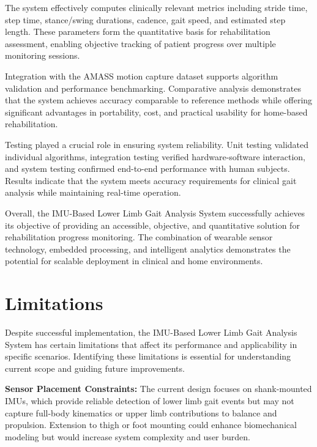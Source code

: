 \documentclass[12pt,a4paper]{report}
\begin{document}
The system effectively computes clinically relevant metrics including stride time, step time, stance/swing durations, cadence, gait speed, and estimated step length. These parameters form the quantitative basis for rehabilitation assessment, enabling objective tracking of patient progress over multiple monitoring sessions.

Integration with the AMASS motion capture dataset supports algorithm validation and performance benchmarking. Comparative analysis demonstrates that the system achieves accuracy comparable to reference methods while offering significant advantages in portability, cost, and practical usability for home-based rehabilitation.

Testing played a crucial role in ensuring system reliability. Unit testing validated individual algorithms, integration testing verified hardware-software interaction, and system testing confirmed end-to-end performance with human subjects. Results indicate that the system meets accuracy requirements for clinical gait analysis while maintaining real-time operation.

Overall, the IMU-Based Lower Limb Gait Analysis System successfully achieves its objective of providing an accessible, objective, and quantitative solution for rehabilitation progress monitoring. The combination of wearable sensor technology, embedded processing, and intelligent analytics demonstrates the potential for scalable deployment in clinical and home environments.

\section{Limitations}

Despite successful implementation, the IMU-Based Lower Limb Gait Analysis System has certain limitations that affect its performance and applicability in specific scenarios. Identifying these limitations is essential for understanding current scope and guiding future improvements.

\textbf{Sensor Placement Constraints:}  
The current design focuses on shank-mounted IMUs, which provide reliable detection of lower limb gait events but may not capture full-body kinematics or upper limb contributions to balance and propulsion. Extension to thigh or foot mounting could enhance biomechanical modeling but would increase system complexity and user burden.

\vspace{0.3cm}
\end{document}
